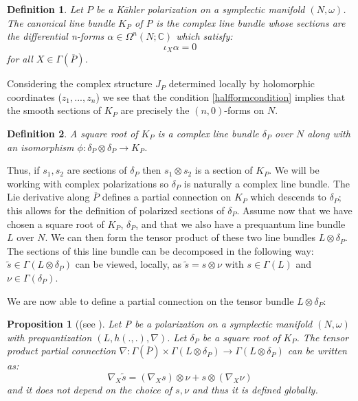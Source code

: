 \documentclass[a4paper,11pt]{article}
\newtheorem{definition}{Definition}
\newtheorem{proposition}{Proposition}
\begin{document}
\begin{definition}
Let $P$ be a Kähler polarization on a symplectic manifold $(N,\omega)$. The canonical line bundle $K_{P}$ of P is the complex line bundle whose sections are the differential n-forms $\alpha\in \Omega^{n}(N;\mathbb{C})$ which satisfy:
\begin{equation}
    \iota_{X}\alpha = 0
    \label{halfformcondition}
\end{equation}
for all $X\in \Gamma(\overline{P})$.
\end{definition}

Considering the complex structure $J_{P}$ determined locally by holomorphic coordinates ($z_{1},...,z_{n}$) we see that the condition \eqref{halfformcondition} implies that the smooth sections of $K_{P}$ are precisely the $(n,0)$-forms on $N$.

\begin{definition}
A square root of $K_{P}$ is a complex line bundle $\delta_{P}$ over $N$ along with an isomorphism $\phi: \delta_{P}\otimes \delta_{P}\rightarrow K_{P}$.
\end{definition}

Thus, if $s_{1},s_{2}$ are sections of $\delta_{P}$ then $s_{1}\otimes s_{2}$ is a section of $K_{P}$. We will be working with  complex polarizations so $\delta_{P}$ is naturally a complex line bundle. The Lie derivative along 
$\overline{P}$ defines a partial connection on $K_{P}$ which descends to $\delta_{P}$; this allows for the definition of polarized sections of $\delta_{P}$. 
Assume now that we have chosen a square root of $K_{P}$, $\delta_{P}$, and that we also have a prequantum line bundle $L$ over $N$. We can then form the tensor product of these two line bundles $L\otimes\delta_{P}$. The sections of this line bundle can be decomposed in the following way: $\tilde{s}\in\Gamma(L\otimes\delta_{P})$ can be viewed, locally, as $\tilde{s}=s\otimes\nu$ with $s\in\Gamma(L)$ and $\nu\in\Gamma(\delta_{P})$.\par
We are now able to define a partial connection on the tensor bundle $L\otimes \delta_{P}$:

\begin{proposition}[(see \cite{BrianHall}]
Let P be a polarization on a symplectic manifold $(N,\omega)$ with prequantization $(L,h(.,.),\nabla)$. Let $\delta_{P}$ be a square root of $K_{P}$. The tensor product partial connection $\nabla: \Gamma(\overline{P})\times \Gamma(L\otimes\delta_{P})\rightarrow \Gamma(L\otimes\delta_{P})$ can be written as:
\begin{equation*}
    \nabla_{X}\tilde{s} = (\nabla_{X}s)\otimes \nu + s\otimes(\nabla_{X}\nu)
\end{equation*}
and it does not depend on the choice of $s,\nu$ and thus it is defined globally.
\end{proposition}
\end{document}
